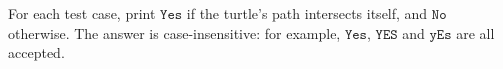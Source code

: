 For each test case, print $\texttt{Yes}$ if the turtle's path intersects itself, and $\texttt{No}$ otherwise. The answer is case-insensitive: for example, $\texttt{Yes}$, $\texttt{YES}$ and $\texttt{yEs}$ are all accepted.
